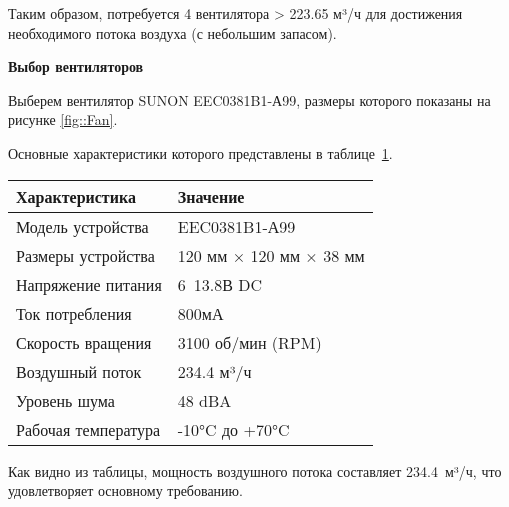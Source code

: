 Таким образом, потребуется 4 вентилятора > 223.65 м³/ч для достижения необходимого потока воздуха (с небольшим запасом).

\textbf{Выбор вентиляторов}

Выберем вентилятор SUNON EEC0381B1-А99, размеры которого показаны на рисунке \ref{fig::Fan}.


Основные характеристики которого представлены в таблице~\ref{tab::FanCharacteristics}.

\begin{table}[H]
	\centering
	\caption{Основные характеристики вентилятора EEC0381B1-А99}
	\begin{longtable}{| m{7cm} | m{7cm} |}
		\hline
		\textbf{Характеристика} & \textbf{Значение} \\ \hline
		\endhead \hline
		Модель устройства & EEC0381B1-А99 \\ \hline
		Размеры устройства & 120 мм × 120 мм × 38 мм \\ \hline
		Напряжение питания & 6~13.8В DC \\ \hline
		Ток потребления & 800мА \\ \hline
		Скорость вращения & 3100 об/мин (RPM) \\ \hline
		Воздушный поток & 234.4 м³/ч \\ \hline
		Уровень шума & 48 dBA \\ \hline
		Рабочая температура & -10°C до +70°C \\ \hline
	\end{longtable}
	\label{tab::FanCharacteristics}
\end{table}

Как видно из таблицы, мощность воздушного потока составляет 234.4~м³/ч, что удовлетворяет основному требованию.

